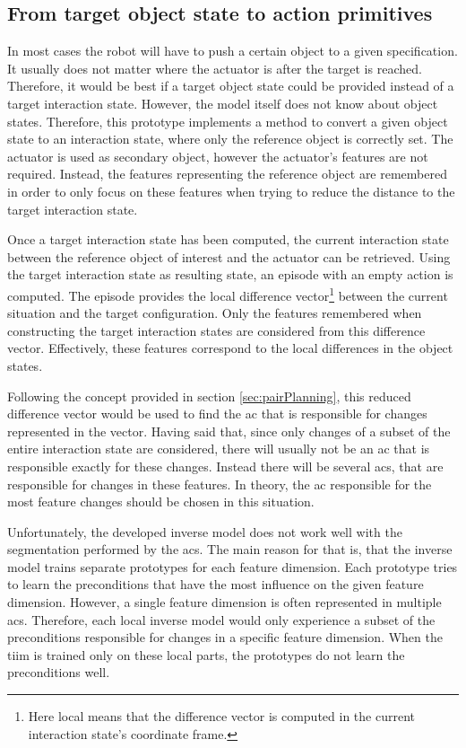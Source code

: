 \subsection{From target object state to action primitives\label{sec:pairPlanningReal}}

In most cases the robot will have to push a certain object to a given specification. It usually does not matter where the actuator is after the target is reached. Therefore, it would be best if a target object state could be provided instead of a target interaction state. However, the model itself does not know about object states. Therefore, this prototype implements a method to convert a given object state to an interaction state, where only the reference object is correctly set. The actuator is used as secondary object, however the actuator's features are not required. Instead, the features representing the reference object are remembered in order to only focus on these features when trying to reduce the distance to the target interaction state. 

Once a target interaction state has been computed, the current interaction state between the reference object of interest and the actuator can be retrieved. Using the target interaction state as resulting state, an episode with an empty action is computed. The episode provides the local difference vector\footnote{Here local means that the difference vector is computed in the current interaction state's coordinate frame.} between the current situation and the target configuration. Only the features remembered when constructing the target interaction states are considered from this difference vector. Effectively, these features correspond to the local differences in the object states. 

Following the concept provided in section \ref{sec:pairPlanning}, this reduced difference vector would be used to find the \gls{ac} that is responsible for changes represented in the vector.
Having said that, since only changes of a subset of the entire interaction state are considered, there will usually not be an \gls{ac} that is responsible exactly for these changes. 
Instead there will be several \glspl{ac}, that are responsible for changes in these features. In theory, the \gls{ac} responsible for the most feature changes should be chosen in this situation. 

Unfortunately, the developed inverse model does not work well with the segmentation performed by the \glspl{ac}. The main reason for that is, that the inverse model trains separate prototypes for each feature dimension.
Each prototype tries to learn the preconditions that have the most influence on the given feature dimension. However, a single feature dimension is often represented in multiple \glspl{ac}. Therefore, each local inverse model would only experience a subset of the preconditions responsible for changes in a specific feature dimension. When the \gls{tiim} is trained only on these local parts, the prototypes do not learn the preconditions well.

